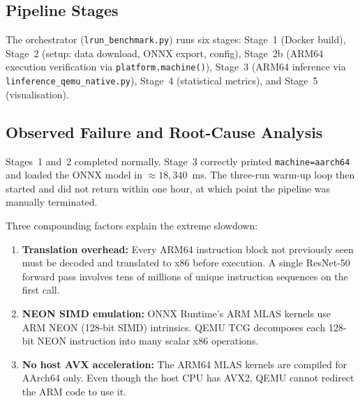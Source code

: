 \subsection{Pipeline Stages}

The orchestrator (\texttt{lrun\_benchmark.py}) runs six stages:
Stage~1 (Docker build), Stage~2 (setup: data download, ONNX export, config),
Stage~2b (ARM64 execution verification via \texttt{platform.machine()}),
Stage~3 (ARM64 inference via \texttt{linference\_qemu\_native.py}),
Stage~4 (statistical metrics), and Stage~5 (visualisation).

\subsection{Observed Failure and Root-Cause Analysis}

Stages~1 and~2 completed normally. Stage~3 correctly printed
\texttt{machine=aarch64} and loaded the ONNX model in $\approx18{,}340$~ms.
The three-run warm-up loop then started and did not return within one hour, at
which point the pipeline was manually terminated.

Three compounding factors explain the extreme slowdown:

\begin{enumerate}[itemsep=1pt, topsep=3pt]
    \item \textbf{Translation overhead:} Every ARM64 instruction block not
          previously seen must be decoded and translated to x86 before
          execution. A single ResNet-50 forward pass involves tens of millions
          of unique instruction sequences on the first call.
    \item \textbf{NEON SIMD emulation:} ONNX Runtime's ARM MLAS kernels use
          ARM NEON (128-bit SIMD) intrinsics. QEMU TCG decomposes each
          128-bit NEON instruction into many scalar x86 operations.
    \item \textbf{No host AVX acceleration:} The ARM64 MLAS kernels are
          compiled for AArch64 only. Even though the host CPU has AVX2, QEMU
          cannot redirect the ARM code to use it.
\end{enumerate}

